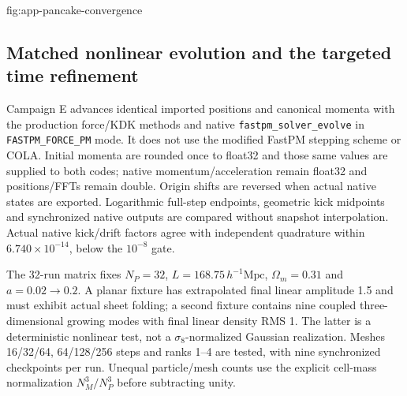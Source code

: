 {fig:app-pancake-convergence}


\subsection{Matched nonlinear evolution and the targeted time refinement}
\label{app:evolution}

Campaign E advances identical imported positions and canonical momenta with
the production \IPPL force/KDK methods and native
\texttt{fastpm\_solver\_evolve} in \texttt{FASTPM\_FORCE\_PM} mode.
It does not use the modified FastPM stepping scheme or COLA.  Initial momenta
are rounded once to float32 and those same values are supplied to both codes;
native momentum/acceleration remain float32 and positions/FFTs remain double.
Origin shifts are reversed when actual native states are exported.
Logarithmic full-step endpoints, geometric kick midpoints and synchronized
native outputs are compared without snapshot interpolation.  Actual native
kick/drift factors agree with independent quadrature within
$6.740\times10^{-14}$, below the $10^{-8}$ gate.

The 32-run matrix fixes $N_P=32$, $L=168.75\,h^{-1}\mathrm{Mpc}$,
$\Omega_m=0.31$ and $a=0.02\to0.2$.  A planar fixture has extrapolated final
linear amplitude 1.5 and must exhibit actual sheet folding; a second fixture
contains nine coupled three-dimensional growing modes with final linear
density RMS 1.  The latter is a deterministic nonlinear test, not a
$\sigma_8$-normalized Gaussian realization.  Meshes 16/32/64, 64/128/256 steps
and ranks 1--4 are tested, with nine synchronized checkpoints per run.
Unequal particle/mesh counts use the explicit cell-mass normalization
$N_M^3/N_P^3$ before subtracting unity.

